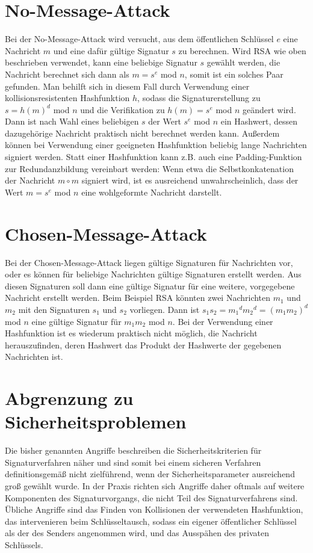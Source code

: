 \documentclass[a4paper,12pt,oneside]{scrreprt}
\begin{document}
\section{No-Message-Attack}

Bei der No-Message-Attack wird versucht, aus dem öffentlichen Schlüssel $e$ eine Nachricht $m$ und eine dafür gültige Signatur $s$ zu berechnen. Wird RSA wie oben beschrieben verwendet, kann eine beliebige Signatur $s$ gewählt werden, die Nachricht berechnet sich dann als $m = s^e$ mod $n$, somit ist ein solches Paar gefunden. Man behilft sich in diesem Fall durch Verwendung einer kollisionsresistenten Hashfunktion $h$, sodass die Signaturerstellung zu $s = h(m)^d$ mod $n$ und die Verifikation zu $h(m) = s^e$ mod $n$ geändert wird. Dann ist nach Wahl eines beliebigen $s$ der Wert $s^e$ mod $n$ ein Hashwert, dessen dazugehörige Nachricht praktisch nicht berechnet werden kann. Außerdem können bei Verwendung einer geeigneten Hashfunktion beliebig lange Nachrichten signiert werden. Statt einer Hashfunktion kann z.B. auch eine Padding-Funktion zur Redundanzbildung vereinbart werden: Wenn etwa die Selbstkonkatenation der Nachricht $m \circ m$ signiert wird, ist es ausreichend unwahrscheinlich, dass der Wert $m = s^e$ mod $n$ eine 
wohlgeformte Nachricht darstellt. 

\section{Chosen-Message-Attack}

Bei der Chosen-Message-Attack liegen gültige Signaturen für Nachrichten vor, oder es können für beliebige Nachrichten gültige Signaturen erstellt werden. Aus diesen Signaturen soll dann eine gültige Signatur für eine weitere, vorgegebene Nachricht erstellt werden. Beim Beispiel RSA könnten zwei Nachrichten $m_1$ und $m_2$ mit den Signaturen $s_1$ und $s_2$ vorliegen. Dann ist $s_1 s_2 = {m_1}^d {m_2}^d = (m_1 m_2)^d$ mod $n$ eine gültige Signatur für $m_1 m_2$ mod $n$. Bei der Verwendung einer Hashfunktion ist es wiederum praktisch nicht möglich, die Nachricht herauszufinden, deren Hashwert das Produkt der Hashwerte der gegebenen Nachrichten ist. 

\section{Abgrenzung zu Sicherheitsproblemen}

Die bisher genannten Angriffe beschreiben die Sicherheitskriterien für Signaturverfahren näher und sind somit bei einem sicheren Verfahren definitionsgemäß nicht zielführend, wenn der Sicherheitsparameter ausreichend groß gewählt wurde. In der Praxis richten sich Angriffe daher oftmals auf weitere Komponenten des Signaturvorgangs, die nicht Teil des Signaturverfahrens sind. Übliche Angriffe sind das Finden von Kollisionen der verwendeten Hashfunktion, das intervenieren beim Schlüsseltausch, sodass ein eigener öffentlicher Schlüssel als der des Senders angenommen wird, und das Ausspähen des privaten Schlüssels. 
\end{document}
